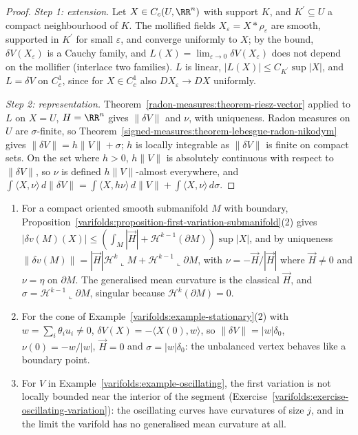 \begin{proof}
\emph{Step 1: extension.} Let $X \in C_c(U, \RR^n)$ with support $K$, and $K^{\prime} \subseteq U$ a compact neighbourhood of $K$. The mollified fields $X_\varepsilon = X * \rho_\varepsilon$ are smooth, supported in
$K^{\prime}$ for small $\varepsilon$, and converge uniformly to $X$; by the bound, $\delta V(X_\varepsilon)$ is a Cauchy family, and $L(X) = \lim_{\varepsilon \to 0}\delta V(X_\varepsilon)$ does not depend on
the mollifier (interlace two families). $L$ is linear, $|L(X)| \leq C_{K^{\prime}}\sup|X|$, and $L = \delta V$ on $C^1_c$, since for $X \in C^1_c$ also $DX_\varepsilon \to DX$ uniformly.

\emph{Step 2: representation.} Theorem~\ref{radon-measures:theorem-riesz-vector} applied to $L$ on $X = U$, $H = \RR^n$ gives $\|\delta V\|$ and $\nu$, with uniqueness. Radon measures on $U$ are
$\sigma$-finite, so Theorem~\ref{signed-measures:theorem-lebesgue-radon-nikodym} gives $\|\delta V\| = h\|V\| + \sigma$; $h$ is locally integrable as $\|\delta V\|$ is finite on compact sets. On the set where
$h > 0$, $h\|V\|$ is absolutely continuous with respect to $\|\delta V\|$, so $\nu$ is defined $h\|V\|$-almost everywhere, and $\int\langle X, \nu\rangle\,d\|\delta V\| = \int\langle X, h\nu\rangle\,d\|V\| + \int\langle X, \nu\rangle\,d\sigma$.
\end{proof}

\begin{example}\label{varifolds:example-generalised-mean-curvature}
\begin{enumerate}
\item For a compact oriented smooth submanifold $M$ with boundary, Proposition~\ref{varifolds:proposition-first-variation-submanifold}(2) gives
$|\delta v(M)(X)| \leq (\int_M|\vec{H}| + \mathcal{H}^{k-1}(\partial M))\sup|X|$, and by uniqueness $\|\delta v(M)\| = |\vec{H}|\mathcal{H}^k\llcorner M + \mathcal{H}^{k-1}\llcorner\partial M$, with
$\nu = -\vec{H}/|\vec{H}|$ where $\vec{H} \neq 0$ and $\nu = \eta$ on $\partial M$. The generalised mean curvature is the classical $\vec{H}$, and $\sigma = \mathcal{H}^{k-1}\llcorner\partial M$, singular because
$\mathcal{H}^k(\partial M) = 0$.
\item For the cone of Example~\ref{varifolds:example-stationary}(2) with $w = \sum_i\theta_iu_i \neq 0$, $\delta V(X) = -\langle X(0), w\rangle$, so $\|\delta V\| = |w|\delta_0$, $\nu(0) = -w/|w|$,
$\vec{H} = 0$ and $\sigma = |w|\delta_0$: the unbalanced vertex behaves like a boundary point.
\item For $V$ in Example~\ref{varifolds:example-oscillating}, the first variation is not locally bounded near the interior of the segment (Exercise~\ref{varifolds:exercise-oscillating-variation}): the
oscillating curves have curvatures of size $j$, and in the limit the varifold has no generalised mean curvature at all.
\end{enumerate}
\end{example}

